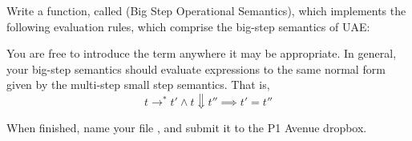 \documentclass{exam}
\let\OldTexttt\texttt
\renewcommand{\texttt}[1]{\OldTexttt{\color{teal}{#1}}}
\begin{document}
Write a function, called \texttt{bsos} (Big Step Operational Semantics), which implements the following evaluation rules, which comprise the big-step semantics of UAE:
\begin{center}
\texttt{[image: figures/bigstep.png]}
\end{center}

You are free to introduce the \texttt{Wrong} term anywhere it may be appropriate.  In general, your big-step semantics should evaluate expressions to the same normal form given by the multi-step small step semantics.  That is,
\begin{equation}
t \rightarrow^* t' \land t \Downarrow t'' \implies t' = t''
\end{equation}

When finished, name your file \texttt{UAE-3.hs}, and submit it to the P1 Avenue dropbox.
\end{document}
